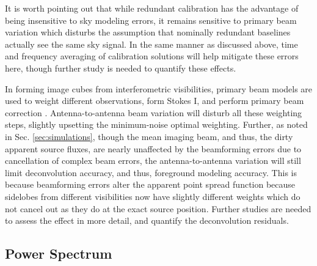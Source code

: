 It is worth pointing out that while redundant calibration \citep{liu10,zheng14} has the advantage of being insensitive to sky modeling errors, it remains sensitive to primary beam variation which disturbs the assumption that nominally redundant baselines actually see the same sky signal. In the same manner as discussed above, time and frequency averaging of calibration solutions will help mitigate these errors here, though further study is needed to quantify these effects.

In forming image cubes from interferometric visibilities, primary beam models are used to weight different observations, form Stokes I, and perform primary beam correction \citep{williamsimaging, X13, dillonneben,ord2010,bernardi13}. Antenna-to-antenna beam variation will disturb all these weighting steps, slightly upsetting the minimum-noise optimal weighting. Further, as noted in Sec. \ref{sec:simulations}, though the mean imaging beam, and thus, the dirty apparent source fluxes, are nearly unaffected by the beamforming errors due to cancellation of complex beam errors, the antenna-to-antenna variation will still limit deconvolution accuracy, and thus, foreground modeling accuracy. This is because beamforming errors alter the apparent point spread function because sidelobes from different visibilities now have slightly different weights which do not cancel out as they do at the exact source position. Further studies are needed to assess the effect in more detail, and quantify the deconvolution residuals.

\subsection{Power Spectrum}


